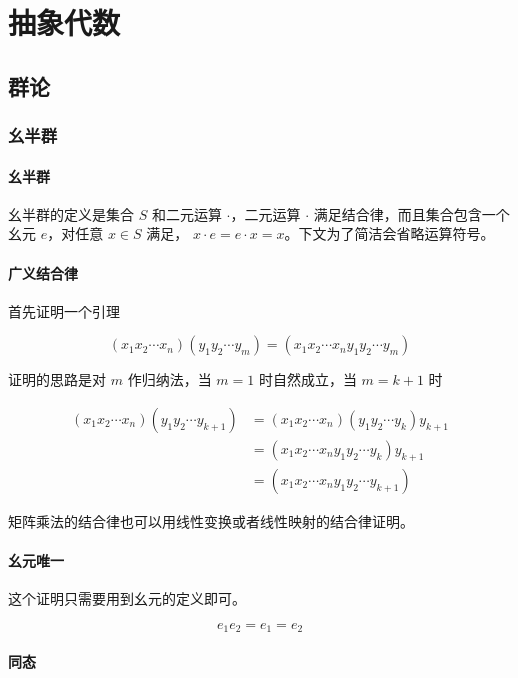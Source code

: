 \chapter{抽象代数}


\section{群论}

\subsection{幺半群}

\subsubsection{幺半群}

幺半群的定义是集合 $S$ 和二元运算 $\cdot$，二元运算 $\cdot$ 满足结合律，而且集合包含一个幺元 $e$，对任意 $x \in S$ 满足，
$x \cdot e = e \cdot x = x$。下文为了简洁会省略运算符号。

\subsubsection{广义结合律}

首先证明一个引理 

\[
    (x_1 x_2 \dotsb x_n) (y_1 y_2 \dotsb y_m) = (x_1 x_2 \dotsb x_n y_1 y_2 \dotsb y_m)
\]

证明的思路是对 $m$ 作归纳法，当 $m=1$ 时自然成立，当 $m=k+1$ 时

\begin{align*}
(x_1 x_2 \dotsb x_n) (y_1 y_2 \dotsb y_{k+1}) & = (x_1 x_2 \dotsb x_n) (y_1 y_2 \dotsb y_{k}) y_{k+1} \\
& = (x_1 x_2 \dotsb x_n y_1 y_2 \dotsb y_{k}) y_{k+1} \\
& = (x_1 x_2 \dotsb x_n y_1 y_2 \dotsb y_{k+1})
\end{align*}

矩阵乘法的结合律也可以用线性变换或者线性映射的结合律证明。


\subsubsection{幺元唯一}

这个证明只需要用到幺元的定义即可。

\[
e_1e_2 = e_1 = e_2
\]

\subsubsection{同态}


